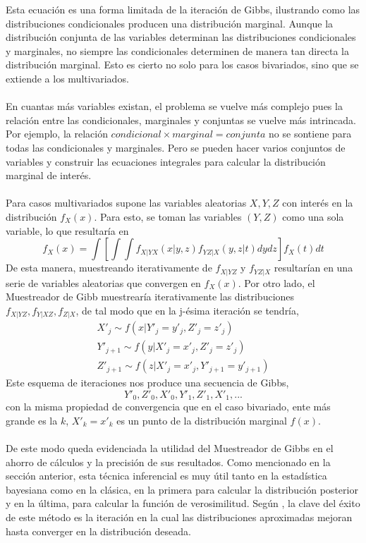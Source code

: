 Esta ecuaci\'on es una forma limitada de la iteraci\'on de Gibbs, ilustrando como las distribuciones condicionales producen una distribuci\'on marginal. Aunque la distribuci\'on conjunta de las variables determinan las distribuciones condicionales y marginales, no siempre las condicionales determinen de manera tan directa la distribuci\'on marginal. Esto es cierto no solo para los casos bivariados, sino que se extiende a los multivariados.\\
\\
En cuantas m\'as variables existan, el problema se vuelve m\'as complejo pues la relaci\'on entre las condicionales, marginales y conjuntas se vuelve m\'as intrincada. Por ejemplo, la relaci\'on $condicional \times marginal = conjunta$ no se sontiene para todas las condicionales y marginales. Pero se pueden hacer varios conjuntos de variables y construir las ecuaciones integrales para calcular la distribuci\'on marginal de inter\'es.\\
\\
Para casos multivariados \cite{casella1992explaining} supone las variables aleatorias $X,Y,Z$ con inter\'es en la distribuci\'on $f_X(x)$. Para esto, se toman las variables $(Y,Z)$ como una sola variable, lo que resultar\'ia en\\
\[f_X(x)= \int [ \int \int f_{X|YX}(x|y,z)f_{YZ|X}(y,z|t)dy dz] f_X(t) dt\]
De esta manera, muestreando iterativamente de $f_{X|YZ}$ y $f_{YZ|X}$ resultar\'ian en una serie de variables aleatorias que convergen en $f_X(x)$. Por otro lado, el Muestreador de Gibb muestrear\'ia iterativamente las distribuciones $f_{X|YZ}, f_{Y|XZ}, f_{Z|X}$, de tal modo que en la j-\'esima iteraci\'on se tendr\'ia,\\
\begin{align*}
X'_j \sim f(x|Y'_j = y'_j, Z'_j=z'_j)\\
Y'_{j+1} \sim f(y|X'_j=x'_j, Z'_j=z'_j)\\
Z'_{j+1} \sim f(z|X'_j=x'_j, Y'_{j+1}=y'_{j+1})
\end{align*}
Este esquema de iteraciones nos produce una secuencia de Gibbs,\\
\[Y'_0,Z'_0,X'_0,Y'_1,Z'_1,X'_1,...\]
con la misma propiedad de convergencia que en el caso bivariado, ente m\'as grande es la $k$, $X'_k=x'_k$ es un punto de la distribuci\'on marginal $f(x)$.\\
\\
De este modo queda evidenciada la utilidad del Muestreador de Gibbs en el ahorro de c\'alculos y la precisi\'on de sus resultados. Como mencionado en la secci\'on anterior, esta t\'ecnica inferencial es muy \'util tanto en la estad\'istica bayesiana como en la cl\'asica, en la primera para calcular la distribuci\'on posterior y en la \'ultima, para calcular la funci\'on de verosimilitud. Seg\'un \cite{gelman2014bayesian}, la clave del \'exito de este m\'etodo es la iteraci\'on en la cual las distribuciones aproximadas mejoran hasta converger en la distribuci\'on deseada.\\
